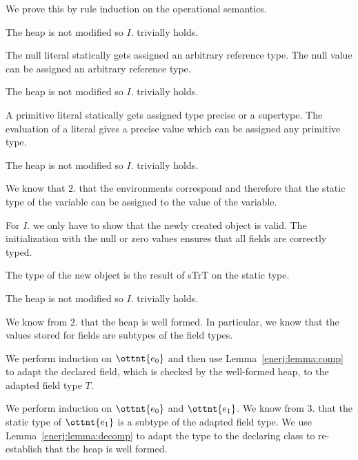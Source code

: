 We prove this by rule induction on the operational semantics.


The heap is not modified so $I.$ trivially holds.

The null literal statically gets assigned an arbitrary reference type.
The null value can be assigned an arbitrary reference type.



The heap is not modified so $I.$ trivially holds.

A primitive literal statically gets assigned type precise or a supertype.
The evaluation of a literal gives a precise value which can be assigned any primitive type.



The heap is not modified so $I.$ trivially holds.

We know that $2.$ that the environments correspond and therefore that the static
type of the variable can be assigned to the value of the variable.



For $I.$ we only have to show that the newly created object is valid.
The initialization with the null or zero values ensures that all fields are correctly typed.

The type of the new object is the result of sTrT on the static type.




The heap is not modified so $I.$ trivially holds.

We know from $2.$ that the heap is well formed.
In particular, we know that the values stored for fields are subtypes
of the field types.

We perform induction on $\ottnt{e_{{\mathrm{0}}}}$ and then use Lemma~\ref{enerj:lemma:comp}
to adapt the declared field, which is checked by the well-formed heap,
to the adapted field type $T$.



We perform induction on $\ottnt{e_{{\mathrm{0}}}}$ and $\ottnt{e_{{\mathrm{1}}}}$.
We know from $3.$ that the static type of $\ottnt{e_{{\mathrm{1}}}}$ is a subtype of the
adapted field type.
We use Lemma~\ref{enerj:lemma:decomp} to adapt the type to the declaring
class to re-establish that the heap is well formed.


